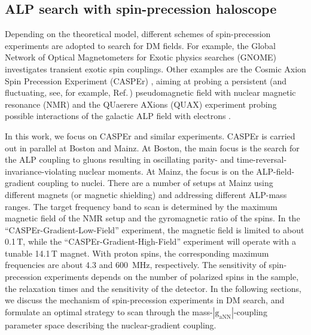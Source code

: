 \subsection{ALP search with spin-precession haloscope}



Depending on the theoretical model, different schemes of spin-precession experiments are adopted to search for DM fields.
For example, the Global Network of Optical Magnetometers for Exotic physics searches (GNOME) \cite{Pustelny_AdP_GNOMEnovel, Pospelov_PhysRevLett_DomainWalls, Kimball_2018_PhysRevD_terrestrial, Masia-Roig_2020_Analysismethod, Afach_2021_topological} investigates transient exotic spin couplings. 
Other examples are the Cosmic Axion Spin Precession Experiment (CASPEr) \cite{budkergraham2014proposal}, aiming at probing a persistent (and fluctuating, see, for example, Ref.\,\cite{Centers2021Stochastic}) pseudomagnetic field
with nuclear magnetic resonance (NMR) and the QUaerere AXions (QUAX) experiment probing possible interactions of the galactic ALP field with 
electrons %
\cite{Crescini2020_Ferromagnetic}. 

In this work, we focus on CASPEr and similar experiments. CASPEr is carried out in parallel at Boston and Mainz. At Boston, the main focus is the search for the ALP coupling to gluons resulting in oscillating parity- and time-reversal-invariance-violating nuclear moments. At Mainz, the focus is on the ALP-field-gradient coupling to nuclei. There are a number of setups at Mainz using different magnets (or magnetic shielding) and addressing different ALP-mass ranges. 
The target frequency band to scan is determined by the maximum magnetic field of the NMR setup and the gyromagnetic ratio of the spins. 
In the ``CASPEr-Gradient-Low-Field'' experiment, the magnetic field is limited to about 0.1\,T, while the ``CASPEr-Gradient-High-Field'' experiment will operate with a tunable 14.1\,T magnet.
With proton spins,  the corresponding maximum frequencies are about 4.3 and \SI{600}{\MHz}, respectively. 
The sensitivity of spin-precession experiments depends on the number of polarized spins in the sample, the relaxation times and the sensitivity of the detector. In the following sections, we discuss the mechanism of spin-precession experiments in DM search, and formulate an optimal strategy to scan through the mass-$|\mathrm{g_{aNN}}|$-coupling parameter space describing the nuclear-gradient coupling. 

